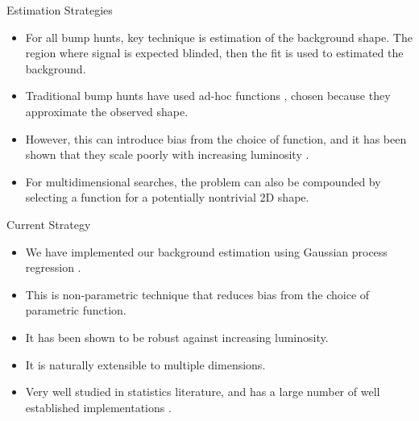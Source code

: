 \documentclass[10pt]{beamer}
\begin{document}
\begin{frame}{Estimation Strategies}
  \begin{splitcol}[0.55]
    \begin{col}
      \begin{itemize}
      \item For all bump hunts, key technique is estimation of the background shape. The region where signal is expected blinded, then the fit is used to estimated the background.
      \item Traditional bump hunts have used ad-hoc functions \cite{zisopoulos_parametric_2023}, chosen because they approximate the observed shape. 
      \item However, this can introduce bias from the choice of function, and it has been shown that they scale poorly with increasing luminosity \cite{frate_modeling_2017}.
      \item For multidimensional searches, the problem can also be compounded by selecting a function for a potentially nontrivial 2D shape. 
      \end{itemize}
    \end{col}

    \begin{col}
      \begin{center}
      \end{center}
    \end{col}
  \end{splitcol}
\end{frame}

\begin{frame}{Current Strategy}
  \begin{itemize}
  \item We have implemented our background estimation using Gaussian process regression \cite{rasmussen_gaussian_2006}.
  \item This is non-parametric technique that reduces bias from the choice of parametric function.
  \item It has been shown to be robust against increasing luminosity\cite{frate_modeling_2017}.
  \item It is naturally extensible to multiple dimensions.
  \item Very well studied in statistics literature, and has a large number of well established implementations \cite{gardner_gpytorch_2021}. 
  \end{itemize}
\end{frame}
\end{document}
